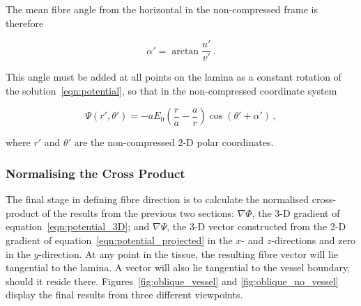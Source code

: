     The mean fibre angle from the horizontal in the non-compressed frame is therefore
    
    \begin{equation}
      \alpha' = \arctan \frac{u'}{v'}\,.
    \end{equation}
    
    This angle must be added at all points on the lamina as a constant rotation of the solution~\ref{eqn:potential}, so that in the non-compressed coordinate system
    
    \begin{equation}
      \Psi(r',\theta') = -aE_0 \left( \frac{r}{a} - \frac{a}{r} \right) \cos\left( \theta' + \alpha' \right)\,,
      \label{eqn:potential_projected}
    \end{equation}
    
    where $r'$ and $\theta'$ are the non-compressed 2-D polar coordinates.
  
  \subsubsection{Normalising the Cross Product} %
  \label{sub:normalising_the_cross_product}
    The final stage in defining fibre direction is to calculate the normalised cross-product of the results from the previous two sections: $\nabla\Phi$, the 3-D gradient of equation~\ref{eqn:potential_3D}; and $\nabla\Psi$, the 3-D vector constructed from the 2-D gradient of equation~\ref{eqn:potential_projected} in the $x$- and $z$-directions and zero in the $y$-direction. At any point in the tissue, the resulting fibre vector will lie tangential to the lamina. A vector will also lie tangential to the vessel boundary, should it reside there. Figures~\ref{fig:oblique_vessel} and \ref{fig:oblique_no_vessel} display the final results from three different viewpoints.
    
